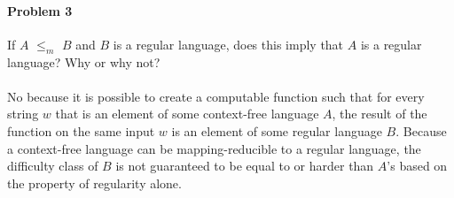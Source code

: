 \documentclass{article}
\begin{document}
    
    
\paragraph{Problem 3} If $A$ $\leq_m$ $B$ and $B$ is a regular language, does this imply that $A$
is a regular language? Why or why not?

\paragraph{} No because it is possible to create a computable function such that for every string $w$ that is an element of some context-free language $A$, the result of the function on the same input $w$ is an element of some regular language $B$. Because a context-free language can be mapping-reducible to a regular language, the difficulty class of $B$ is not guaranteed to be equal to or harder than $A$'s based on the property of regularity alone. 
\end{document}

